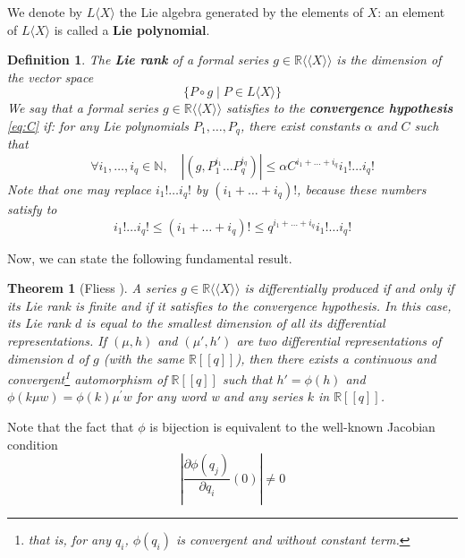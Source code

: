 \documentclass[a4paper,12pt]{article}
\newtheorem*{theorem*}{Theorem}
\newtheorem{definition}{Definition}
\newcommand{\R}{\mathbb{R}}
\newcommand{\N}{\mathbb{N}}
\newcommand{\Lx}{L\langle X\rangle}
\newcommand{\Rxx}{\R\langle\langle X\rangle\rangle}
\begin{document}
We denote by $\Lx$ the Lie algebra generated by the elements of ${X}$: an element of $\Lx$ is called a  \textbf{Lie polynomial}.

\begin{definition}
	The \textbf{Lie rank} of a formal series $g \in \Rxx$ is the dimension of the vector space
	\begin{equation*}
		\{P \circ g \mid P \in \Lx \}
	\end{equation*}
	We say that a formal series $g \in \Rxx$ satisfies to the \textbf{convergence hypothesis} \eqref{eq:C} if: for any Lie polynomials ${P}_1, \ldots, {P}_{{q}}$, there exist constants $\alpha$ and ${C}$ such that
	\begin{equation}
		\tag{C} \label{eq:C}
		\forall i_1, \ldots, i_{{q}} \in \N, \quad \left|\left({g}, {P}_1^{i_1} \ldots {P}_{{q}}^{i_{{q}}}\right)\right| \leq \alpha {C}^{i_1+\ldots+i_{{q}}} {i}_{1} ! \ldots i_q!
	\end{equation}
	Note that one may replace $i_{1} ! \ldots i_{q} !$ by $\left(i_1+\ldots+i_q\right) !$, because these numbers satisfy to
	\begin{equation*}
		i_{1} ! \ldots i_{q} ! \leq\left(i_1+\ldots+i_q\right) ! \leq q^{i_1+\ldots+i_q} i_{1} ! \ldots i_q!
	\end{equation*}
\end{definition}

Now, we can state the following fundamental result. 

\begin{theorem*}[Fliess \cite{5}]
	A series ${g} \in \Rxx$ is differentially produced if and only if its Lie rank is finite and if it satisfies to the convergence hypothesis. In this case, its Lie rank $d$ is equal to the smallest dimension of all its differential representations. 
	If $(\mu, h)$ and $\left(\mu', h'\right)$ are two differential representations of dimension ${d}$ of ${g}$ (with the same $\R[[{q}]]$), then there exists a continuous and convergent\footnote{that is, for any $q_i$, $\phi\left(q_i\right)$ is convergent and without constant term.} automorphism of $\R[[q]]$ such that ${h}'=\phi({h})$ and $\phi({k} \mu {w})=\phi({k}) \mu^{\prime} {w}$ for any word w and any series ${k}$ in $\R[[q]]$.
\end{theorem*}

Note that the fact that $\phi$ is bijection is equivalent to the well-known Jacobian condition
\begin{equation*}
	\left|\frac{\partial \phi\left(q_j\right)}{\partial q_i}(0)\right| \neq 0
\end{equation*}
\end{document}
